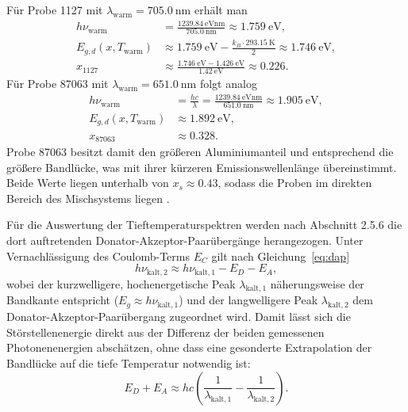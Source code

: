 \documentclass{article}
\begin{document}
Für Probe 1127 mit $\lambda_\mathrm{warm}=\SI{705.0}{\nano\meter}$ erhält man
\begin{align}
    h\nu_\mathrm{warm} &=
    \frac{\SI{1239.84}{\electronvolt\nano\meter}}{\SI{705.0}{\nano\meter}}
    \approx \SI{1.759}{\electronvolt},\\
    E_{g,d}(x,T_\mathrm{warm}) &\approx
    \SI{1.759}{\electronvolt}-\frac{k_B\cdot\SI{293.15}{\kelvin}}{2}
    \approx \SI{1.746}{\electronvolt},\\
    x_{1127} &\approx
    \frac{\SI{1.746}{\electronvolt}-\SI{1.426}{\electronvolt}}{\SI{1.42}{\electronvolt}}
    \approx 0.226.
\end{align}
Für Probe 87063 mit $\lambda_\mathrm{warm}=\SI{651.0}{\nano\meter}$ folgt analog
\begin{align}
    h\nu_\mathrm{warm} &= \frac{hc}{\lambda}
    = \frac{\SI{1239.84}{\electronvolt\nano\meter}}{\SI{651.0}{\nano\meter}}
    \approx \SI{1.905}{\electronvolt},\\
    E_{g,d}(x,T_\mathrm{warm}) &\approx \SI{1.892}{\electronvolt},\\
    x_{87063} &\approx 0.328.
\end{align}
Probe 87063 besitzt damit den größeren Aluminiumanteil und entsprechend die größere Bandlücke, was mit
ihrer kürzeren Emissionswellenlänge übereinstimmt. Beide Werte liegen unterhalb von $x_s\approx0.43$,
sodass die Proben im direkten Bereich des Mischsystems liegen \cite[S.~23--26]{manual}.

Für die Auswertung der Tieftemperaturspektren werden nach Abschnitt 2.5.6 die dort auftretenden
Donator-Akzeptor-Paarübergänge herangezogen. Unter Vernachlässigung des Coulomb-Terms $E_C$ gilt nach
Gleichung~\eqref{eq:dap}
\begin{equation}
    h\nu_\mathrm{kalt,2} \approx h\nu_\mathrm{kalt,1} - E_D - E_A,
    \label{eq:dap_diff}
\end{equation}
wobei der kurzwelligere, hochenergetische Peak $\lambda_\mathrm{kalt,1}$ näherungsweise der Bandkante
entspricht ($E_g\approx h\nu_\mathrm{kalt,1}$) und der langwelligere Peak $\lambda_\mathrm{kalt,2}$ dem
Donator-Akzeptor-Paarübergang zugeordnet wird. Damit lässt sich die Störstellenenergie direkt aus der
Differenz der beiden gemessenen Photonenenergien abschätzen, ohne dass eine gesonderte Extrapolation
der Bandlücke auf die tiefe Temperatur notwendig ist:
\begin{equation}
    E_D+E_A \approx hc\left(\frac{1}{\lambda_\mathrm{kalt,1}}-\frac{1}{\lambda_\mathrm{kalt,2}}\right).
    \label{eq:stoerstellen_abschaetzung}
\end{equation}
\end{document}
